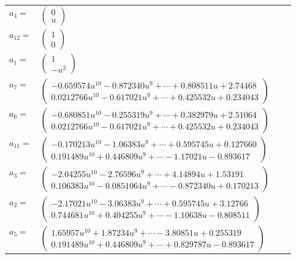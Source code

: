 \documentclass[1p]{elsarticle_modified}
\theoremstyle{definition}
\begin{document}
\begin{tabular}{m{7pt} m{180pt} m{7pt} m{180pt} }
\flushright $a_{4}=$&$\begin{pmatrix}0\\u\end{pmatrix}$ \\
\flushright $a_{12}=$&$\begin{pmatrix}1\\0\end{pmatrix}$ \\
\flushright $a_{1}=$&$\begin{pmatrix}1\\- u^2\end{pmatrix}$ \\
\flushright $a_{7}=$&$\begin{pmatrix}-0.659574 u^{10}-0.872340 u^{9}+\cdots+0.808511 u+2.74468\\0.0212766 u^{10}-0.617021 u^{9}+\cdots+0.425532 u+0.234043\end{pmatrix}$ \\
\flushright $a_{6}=$&$\begin{pmatrix}-0.680851 u^{10}-0.255319 u^{9}+\cdots+0.382979 u+2.51064\\0.0212766 u^{10}-0.617021 u^{9}+\cdots+0.425532 u+0.234043\end{pmatrix}$ \\
\flushright $a_{11}=$&$\begin{pmatrix}-0.170213 u^{10}-1.06383 u^{9}+\cdots+0.595745 u+0.127660\\0.191489 u^{10}+0.446809 u^{9}+\cdots-1.17021 u-0.893617\end{pmatrix}$ \\
\flushright $a_{3}=$&$\begin{pmatrix}-2.04255 u^{10}-2.76596 u^{9}+\cdots+4.14894 u+1.53191\\0.106383 u^{10}-0.0851064 u^{9}+\cdots-0.872340 u+0.170213\end{pmatrix}$ \\
\flushright $a_{2}=$&$\begin{pmatrix}-2.17021 u^{10}-3.06383 u^{9}+\cdots+0.595745 u+3.12766\\0.744681 u^{10}+0.404255 u^{9}+\cdots-1.10638 u-0.808511\end{pmatrix}$ \\
\flushright $a_{5}=$&$\begin{pmatrix}1.65957 u^{10}+1.87234 u^{9}+\cdots-3.80851 u+0.255319\\0.191489 u^{10}+0.446809 u^{9}+\cdots+0.829787 u-0.893617\end{pmatrix}$ \\

\end{tabular}
\end{document}
